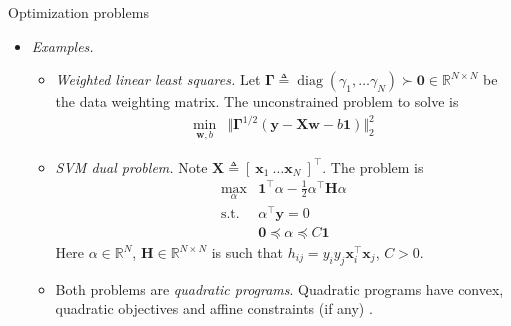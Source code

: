 \documentclass{beamer}
\numberwithin{equation}{section}
\begin{document}
\begin{frame}{Optimization problems}
    \begin{itemize}
        \item
        \textit{Examples.}
        \begin{itemize}
            \item
            \textit{Weighted linear least squares.} Let $ \mathbf{\Gamma}
            \triangleq \operatorname{diag}(\gamma_1, \ldots \gamma_N) \succ
            \mathbf{0} \in \mathbb{R}^{N \times N} $ be the data weighting
            matrix. The unconstrained problem to solve is
            \begin{equation*}
                \begin{array}{ll}
                    \displaystyle\min_{\mathbf{w}, b} &
                    \Vert
                        \mathbf{\Gamma}^{1 / 2}(\mathbf{y} - \mathbf{Xw} -
                        b\mathbf{1})
                    \Vert_2^2
                \end{array}
            \end{equation*}

            \item
            \textit{SVM dual problem.} Note $ \mathbf{X} \triangleq
            [ \ \mathbf{x}_1 \ \ldots \mathbf{x}_N \ ]^\top $. The problem is
            \begin{equation*}
                \begin{array}{ll}
                    \displaystyle\max_\alpha & \mathbf{1}^\top\alpha -
                    \frac{1}{2}\alpha^\top\mathbf{H}\alpha \\
                    \text{s.t.} & \alpha^\top\mathbf{y} = 0 \\
                    & \mathbf{0} \preceq \alpha \preceq C\mathbf{1}
                \end{array}
            \end{equation*}
            Here $ \alpha \in \mathbb{R}^N $,
            $ \mathbf{H} \in \mathbb{R}^{N \times N} $ is such that
            $ h_{ij} = y_iy_j\mathbf{x}_i^\top\mathbf{x}_j $, $ C > 0 $.

            \item
            Both problems are \textit{quadratic programs}. Quadratic programs
            have convex, quadratic objectives and affine constraints (if any)
            \cite{bv_convex_opt}.
        \end{itemize}
    \end{itemize}
\end{frame}
\end{document}
